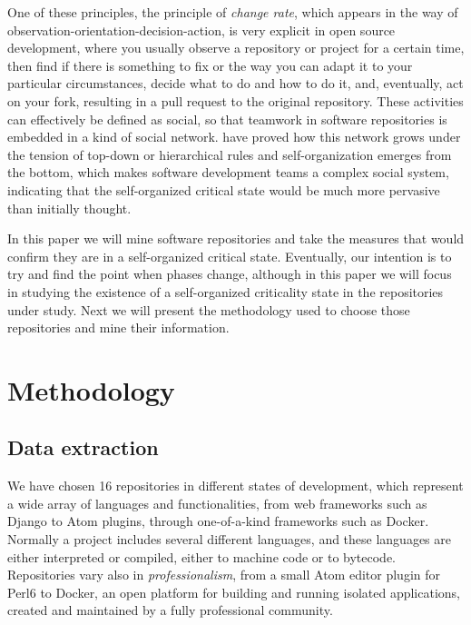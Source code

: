 \documentclass[conference]{IEEEtran}
\begin{document}
One of these principles, the principle of {\em change rate}, which appears in the
way of observation-orientation-decision-action, is very explicit in
open source development, where you usually observe a repository or
project for a certain time, then find if there is something to fix or
the way you can adapt it to your particular circumstances, decide what
to do and how to do it, and, eventually, act on your fork, resulting in a
pull request to the original repository. These activities can
effectively be defined as social, so that teamwork in software
repositories is embedded in a kind of social
network. \cite{valverde2007self}
have proved how this network grows under the tension of top-down or
hierarchical rules and self-organization emerges from the bottom,
which makes software development teams a complex social system, indicating that the self-organized critical state would be much
more pervasive than initially thought. 

In this paper we will mine software repositories and take the measures
that would confirm they are in a self-organized critical
state. Eventually, our intention is to try and find the point when
phases change, although in this paper we will focus in studying the
existence of a self-organized criticality state in the repositories under study.
Next we
will present the methodology used to choose those repositories and
mine their information. 




\section{Methodology}
\label{sec:method}

\subsection{Data extraction}
We have chosen 16 repositories in different states of development,
which represent a wide array of languages and functionalities, from
web frameworks such as Django to Atom plugins, through one-of-a-kind
frameworks such as Docker. Normally a project includes several
different languages, and these languages are either
interpreted or compiled, either to machine code or to
bytecode. Repositories vary also in {\em professionalism}, from
a small Atom editor plugin for Perl6 to Docker, an open
platform for building and running isolated applications,
created and maintained by a fully professional community.
\end{document}
